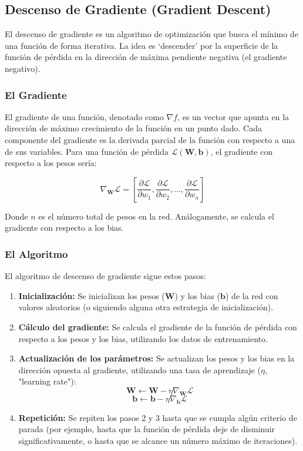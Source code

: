\documentclass{article}
\begin{document}
\subsection{Descenso de Gradiente (Gradient Descent)}

El descenso de gradiente es un algoritmo de optimización que busca el mínimo de una función de forma iterativa.  La idea es `descender' por la superficie de la función de pérdida en la dirección de máxima pendiente negativa (el gradiente negativo).

\subsubsection{El Gradiente}

El gradiente de una función, denotado como \(\nabla f\), es un vector que apunta en la dirección de máximo crecimiento de la función en un punto dado.  Cada componente del gradiente es la derivada parcial de la función con respecto a una de sus variables.  Para una función de pérdida \(\mathcal{L}(\mathbf{W}, \mathbf{b})\), el gradiente con respecto a los pesos sería:

\[
\nabla_{\mathbf{W}} \mathcal{L} = \left[ \frac{\partial \mathcal{L}}{\partial w_1}, \frac{\partial \mathcal{L}}{\partial w_2}, \ldots, \frac{\partial \mathcal{L}}{\partial w_n} \right]
\]

Donde \(n\) es el número total de pesos en la red.  Análogamente, se calcula el gradiente con respecto a los bias.

\subsubsection{El Algoritmo}

El algoritmo de descenso de gradiente sigue estos pasos:

\begin{enumerate}
    \item \textbf{Inicialización:} Se inicializan los pesos (\(\mathbf{W}\)) y los bias (\(\mathbf{b}\)) de la red con valores aleatorios (o siguiendo alguna otra estrategia de inicialización).
    \item \textbf{Cálculo del gradiente:} Se calcula el gradiente de la función de pérdida con respecto a los pesos y los bias, utilizando los datos de entrenamiento.
    \item \textbf{Actualización de los parámetros:} Se actualizan los pesos y los bias en la dirección opuesta al gradiente, utilizando una tasa de aprendizaje (\(\eta\), "learning rate"):
        \[
        \mathbf{W} \leftarrow \mathbf{W} - \eta \nabla_{\mathbf{W}} \mathcal{L}
        \]
        \[
        \mathbf{b} \leftarrow \mathbf{b} - \eta \nabla_{\mathbf{b}} \mathcal{L}
        \]
    \item \textbf{Repetición:} Se repiten los pasos 2 y 3 hasta que se cumpla algún criterio de parada (por ejemplo, hasta que la función de pérdida deje de disminuir significativamente, o hasta que se alcance un número máximo de iteraciones).
\end{enumerate}
\end{document}
